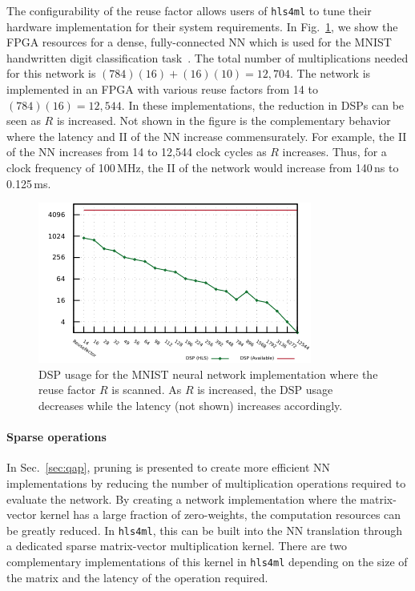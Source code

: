 \documentclass[tinyml]{acmart}
\newcommand{\hlsfml}{\texttt{hls4ml}\xspace}
\begin{document}
The configurability of the reuse factor allows users of \hlsfml to tune their hardware implementation for their system requirements.
In Fig.~\ref{fig:largeR}, we show the FPGA resources for a dense, fully-connected NN which is used for the MNIST handwritten digit classification task~\cite{MNIST}.
The total number of multiplications needed for this network is $(784)(16) + (16)(10) = 12,704$.
The network is implemented in an FPGA with various reuse factors from 14 to $(784)(16)=12,544$.
In these implementations, the reduction in DSPs can be seen as $R$ is increased.
Not shown in the figure is the complementary behavior where the latency and II of the NN increase commensurately.
For example, the II of the NN increases from 14 to 12,544 clock cycles as $R$ increases.
Thus, for a clock frequency of 100\,MHz, the II of the network would increase from 140\,ns to 0.125\,ms.

\begin{figure}[t!]
\begin{center}
\includegraphics[width=0.9\columnwidth]{Figs/largeReuse.pdf}
\end{center}
\caption{DSP usage for the MNIST neural network implementation where the reuse factor $R$ is scanned.
As $R$ is increased, the DSP usage decreases while the latency (not shown) increases accordingly.}
\label{fig:largeR}
\end{figure}

\paragraph{Sparse operations}

In Sec.~\ref{sec:qap}, pruning is presented to create more efficient NN implementations by reducing the number of multiplication operations required to evaluate the network.
By creating a network implementation where the matrix-vector kernel has a large fraction of zero-weights, the computation resources can be greatly reduced.
In \hlsfml, this can be built into the NN translation through a dedicated sparse matrix-vector multiplication kernel.
There are two complementary implementations of this kernel in \hlsfml depending on the size of the matrix and the latency of the operation required.
\end{document}
